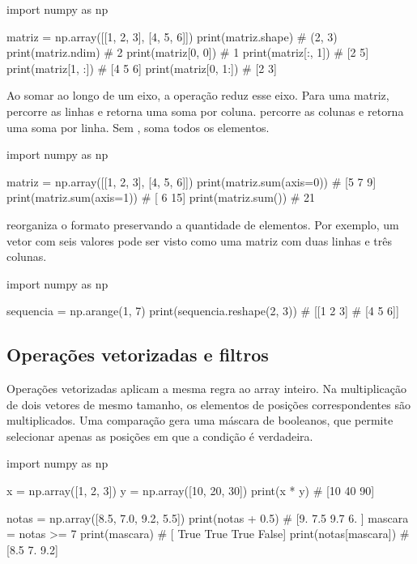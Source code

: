 \begin{exemplo}
import numpy as np

matriz = np.array([[1, 2, 3], [4, 5, 6]])
print(matriz.shape)   # (2, 3)
print(matriz.ndim)    # 2
print(matriz[0, 0])   # 1
print(matriz[:, 1])   # [2 5]
print(matriz[1, :])   # [4 5 6]
print(matriz[0, 1:])  # [2 3]
\end{exemplo}

Ao somar ao longo de um eixo, a operação reduz esse eixo. Para uma matriz,  percorre as linhas e retorna uma soma por coluna.  percorre as colunas e retorna uma soma por linha. Sem ,  soma todos os elementos.

\begin{exemplo}
import numpy as np

matriz = np.array([[1, 2, 3], [4, 5, 6]])
print(matriz.sum(axis=0))  # [5 7 9]
print(matriz.sum(axis=1))  # [ 6 15]
print(matriz.sum())        # 21
\end{exemplo}

 reorganiza o formato preservando a quantidade de elementos. Por exemplo, um vetor com seis valores pode ser visto como uma matriz com duas linhas e três colunas.

\begin{exemplo}
import numpy as np

sequencia = np.arange(1, 7)
print(sequencia.reshape(2, 3))
# [[1 2 3]
#  [4 5 6]]
\end{exemplo}

\subsection{Operações vetorizadas e filtros}

Operações vetorizadas aplicam a mesma regra ao array inteiro. Na multiplicação de dois vetores de mesmo tamanho, os elementos de posições correspondentes são multiplicados. Uma comparação gera uma máscara de booleanos, que permite selecionar apenas as posições em que a condição é verdadeira.

\begin{exemplo}
import numpy as np

x = np.array([1, 2, 3])
y = np.array([10, 20, 30])
print(x * y)  # [10 40 90]

notas = np.array([8.5, 7.0, 9.2, 5.5])
print(notas + 0.5)  # [9.  7.5 9.7 6. ]
mascara = notas >= 7
print(mascara)         # [ True  True  True False]
print(notas[mascara])  # [8.5 7.  9.2]
\end{exemplo}

